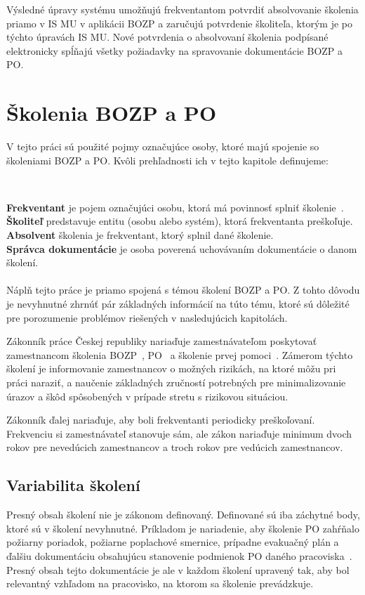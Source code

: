 \documentclass[
  digital,     %
  oneside,     %
  nosansbold,  %
  nocolorbold, %
  lof,         %
  nolot,         %
]{fithesis4}
\begin{document}
Výsledné úpravy systému umožňujú frekventantom potvrdiť absolvovanie školenia priamo v IS MU v aplikácii BOZP a zaručujú potvrdenie školiteľa, ktorým je po týchto úpravách IS MU. Nové potvrdenia o absolvovaní školenia podpísané elektronicky spĺňajú všetky požiadavky na spravovanie dokumentácie BOZP a PO.


\chapter{Školenia BOZP a PO}
\label{kap-1}
V tejto práci sú použité pojmy označujúce osoby, ktoré majú spojenie so školeniami BOZP a PO. Kvôli prehľadnosti ich v tejto kapitole definujeme:

~

    \textbf{Frekventant} je pojem označujúci osobu, ktorá má povinnosť splniť školenie~\cite[9]{kandova2019}.\\
    
    \textbf{Školiteľ} predstavuje entitu (osobu alebo systém), ktorá frekventanta preškoľuje.\\
    
    \textbf{Absolvent} školenia je frekventant, ktorý splnil dané školenie.\\

    \textbf{Správca dokumentácie} je osoba poverená uchovávaním dokumentácie o danom školení.
~
\\\\
Náplň tejto práce je priamo spojená s témou školení BOZP a PO. Z tohto dôvodu je nevyhnutné zhrnúť pár základných informácií na túto tému, ktoré sú dôležité pre porozumenie problémov riešených v nasledujúcich kapitolách.

Zákonník práce Českej republiky nariaďuje zamestnávateľom poskytovať zamestnancom školenia BOZP~\cite[§~103~odst.~3]{cesko_zakonik_prace}, PO~\cite[§~349~odst.~1]{cesko_zakonik_prace} a školenie prvej pomoci~\cite[§~102~odst.~6]{cesko_zakonik_prace}. Zámerom týchto školení je informovanie zamestnancov o možných rizikách, na ktoré môžu pri práci naraziť, a naučenie základných zručností potrebných pre minimalizovanie úrazov a škôd spôsobených v prípade stretu s rizikovou situáciou.

Zákonník ďalej nariaďuje, aby boli frekventanti periodicky preškoľovaní. Frekvenciu si zamestnávateľ stanovuje sám, ale zákon nariaďuje minimum dvoch rokov pre nevedúcich zamestnancov a troch rokov pre vedúcich zamestnancov.~\cite[~§103~odst.~3]{cesko_zakonik_prace}

\section{Variabilita školení}
Presný obsah školení nie je zákonom definovaný. Definované sú iba záchytné body, ktoré sú v školení nevyhnutné. Príkladom je nariadenie, aby školenie PO zahŕňalo požiarny poriadok, požiarne poplachové smernice, prípadne evakuačný plán a ďalšiu dokumentáciu obsahujúcu stanovenie podmienok PO daného pracoviska~\cite[~§23~odst.~1~c)]{cesko_vyhlaska_poziarna_prevence}. Presný obsah tejto dokumentácie je ale v každom školení upravený tak, aby bol relevantný vzhľadom na pracovisko, na ktorom sa školenie prevádzkuje.
\end{document}
